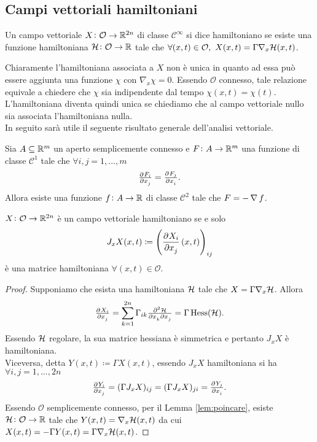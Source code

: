 \subsection{Campi vettoriali hamiltoniani}

\begin{definition}
    Un campo vettoriale $ X \colon \mathcal{O} \to \mathbb{R}^{2n} $ di classe $ \mathcal{C}^\infty $ si dice hamiltoniano se esiste una funzione hamiltoniana $ \mathcal{H} \colon \mathcal{O} \to \mathbb{R} $ tale che $ \forall (x, t) \in \mathcal{O}, \ X(x, t) = \Gamma \nabla_x \mathcal{H}(x, t) $.
\end{definition}

Chiaramente l'hamiltoniana associata a $ X $ non è unica in quanto ad essa può essere aggiunta una funzione $ \chi $ con $ \nabla_x \chi = 0 $. Essendo $ \mathcal{O} $ connesso, tale relazione equivale a chiedere che $ \chi $ sia indipendente dal tempo $ \chi(x, t) = \chi(t) $. L'hamiltoniana diventa quindi unica se chiediamo che al campo vettoriale nullo sia associata l'hamiltoniana nulla. \\

In seguito sarà utile il seguente risultato generale dell'analisi vettoriale.

\begin{lemma}[Poincaré] \label{lem:poincare}
    Sia $ A \subseteq \mathbb{R}^m $ un aperto semplicemente connesso e $ F \colon A \to \mathbb{R}^m $ una funzione di classe $ \mathcal{C}^1 $ tale che $ \forall i, j = 1, \ldots, m $
    \[
        \pd{F_i}{x_j} = \pd{F_j}{x_i}.
    \]
    Allora esiste una funzione $ f \colon A \to \mathbb{R} $ di classe $ \mathcal{C}^2 $ tale che $ F = - \operatorname{\nabla}{f} $.
\end{lemma}

\begin{thm} \label{thm:campo-hamiltoniano}
    $ X \colon \mathcal{O} \to \mathbb{R}^{2n} $ è un campo vettoriale hamiltoniano se e solo
    \begin{equation}
        J_x X (x, t) \coloneqq \left(\dpd{X_i}{x_j}(x, t)\right)_{ij}
    \end{equation}
    è una matrice hamiltoniana $ \forall (x, t) \in \mathcal{O} $.
\end{thm}
\begin{proof}
    Supponiamo che esista una hamiltoniana $ \mathcal{H} $ tale che $ X = \Gamma \nabla_x \mathcal{H} $. Allora
    \[
        \pd{X_i}{x_j} = \sum_{k=1}^{2n} \Gamma_{ik} \md{\ham}{2}{x_k}{}{x_j}{} = \Gamma \, \mathrm{Hess}(\ham).
    \]
    Essendo $ \mathcal{H} $ regolare, la sua matrice hessiana è simmetrica e pertanto $ J_x X $ è hamiltoniana. \\
    Viceversa, detta $ Y(x, t) \coloneqq \Gamma X(x, t) $, essendo $ J_x X $ hamiltoniana si ha $ \forall i, j = 1, \ldots, 2n $
    \[
        \pd{Y_i}{x_j} = (\Gamma J_x X)_{ij} = (\Gamma J_x X)_{ji} = \pd{Y_j}{x_i}.
    \]
    Essendo $ \mathcal{O} $ semplicemente connesso, per il Lemma \ref{lem:poincare},  esiste $ \mathcal{H} \colon \mathcal{O} \to \mathbb{R} $ tale che $ Y(x, t) = \nabla_x \mathcal{H}(x, t) $ da cui $ X(x, t) = -\Gamma Y(x, t) = \Gamma \nabla_x \mathcal{H}(x, t) $.
\end{proof}

